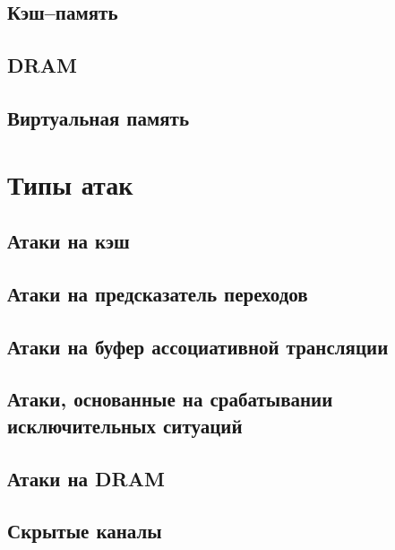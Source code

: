\documentclass[final, xcolor = table, usenames, dvipsnames, table, aspectratio = 169]{beamer}
\begin{document}
\subsection{Кэш--память}


\subsection{DRAM}


\subsection{Виртуальная память}



\section{Типы атак}
\subsection{Атаки на кэш}


\subsection{Атаки на предсказатель переходов}


\subsection{Атаки на буфер ассоциативной трансляции}


\subsection{Атаки, основанные на срабатывании исключительных ситуаций}


\subsection{Атаки на DRAM}


\subsection{Скрытые каналы}

\end{document}
